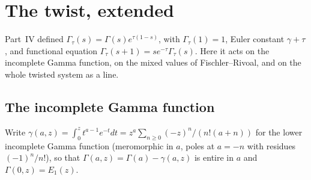 \documentclass[11pt,a4paper]{article}
\theoremstyle{definition}
\theoremstyle{remark}
\numberwithin{equation}{section}
\begin{document}
\section{The twist, extended}\label{V:sec:twist}

Part~IV defined $\Gamma_\tau(s)=\Gamma(s)e^{\tau(1-s)}$, with $\Gamma_\tau(1)=1$, Euler
constant $\gamma+\tau$, and functional equation $\Gamma_\tau(s+1)=se^{-\tau}\Gamma_\tau(s)$.
Here it acts on the incomplete Gamma function, on the mixed values of Fischler--Rivoal, and
on the whole twisted system as a line.

\subsection{The incomplete Gamma function}

Write $\gamma(a,z)=\int_0^zt^{a-1}e^{-t}dt=z^a\sum_{n\ge0}(-z)^n/(n!(a+n))$ for the lower
incomplete Gamma function (meromorphic in $a$, poles at $a=-n$ with residues $(-1)^n/n!$),
so that $\Gamma(a,z)=\Gamma(a)-\gamma(a,z)$ is entire in $a$ and $\Gamma(0,z)=E_1(z)$.
\end{document}
